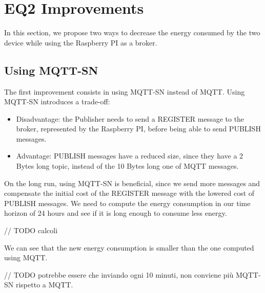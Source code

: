 \section{EQ2 Improvements}
In this section, we propose two ways to decrease the energy consumed by the two device while using the Raspberry PI as a broker. 
\subsection{Using MQTT-SN}
The first improvement consists in using MQTT-SN instead of MQTT. Using MQTT-SN introduces a trade-off: 
\begin{itemize}
	\item Disadvantage: the Publisher needs to send a REGISTER message to the broker, represented by the Raspberry PI, before being able to send PUBLISH messages.
	\item Advantage: PUBLISH messages have a reduced size, since they have a 2 Bytes long topic, instead of the 10 Bytes long one of MQTT messages.
\end{itemize}
On the long run, using MQTT-SN is beneficial, since we send more messages and compensate the initial cost of the REGISTER message with the lowered cost of PUBLISH messages. We need to compute the energy consumption in our time horizon of 24 hours and see if it is long enough to consume less energy.

// TODO calcoli

We can see that the new energy consumption is smaller than the one computed using MQTT.

// TODO potrebbe essere che inviando ogni 10 minuti, non conviene più MQTT-SN rispetto a MQTT.












